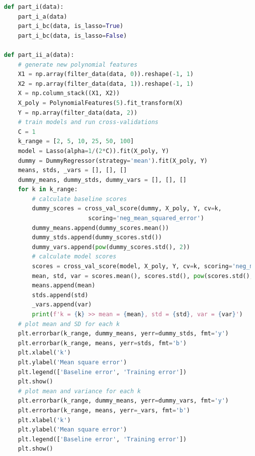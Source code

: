 \documentclass[12pt]{article}
\begin{document}
\begin{lstlisting}[language=Python]
def part_i(data):
    part_i_a(data)
    part_i_bc(data, is_lasso=True)
    part_i_bc(data, is_lasso=False)

def part_ii_a(data):
    # generate new polynomial features
    X1 = np.array(filter_data(data, 0)).reshape(-1, 1)
    X2 = np.array(filter_data(data, 1)).reshape(-1, 1)
    X = np.column_stack((X1, X2))
    X_poly = PolynomialFeatures(5).fit_transform(X)
    Y = np.array(filter_data(data, 2))
    # train models and run cross-validations
    C = 1
    k_range = [2, 5, 10, 25, 50, 100]
    model = Lasso(alpha=1/(2*C)).fit(X_poly, Y)
    dummy = DummyRegressor(strategy='mean').fit(X_poly, Y)
    means, stds, _vars = [], [], []
    dummy_means, dummy_stds, dummy_vars = [], [], []
    for k in k_range:
        # calculate baseline scores
        dummy_scores = cross_val_score(dummy, X_poly, Y, cv=k,
                        scoring='neg_mean_squared_error')
        dummy_means.append(dummy_scores.mean())
        dummy_stds.append(dummy_scores.std())
        dummy_vars.append(pow(dummy_scores.std(), 2))
        # calculate model scores
        scores = cross_val_score(model, X_poly, Y, cv=k, scoring='neg_mean_squared_error')
        mean, std, var = scores.mean(), scores.std(), pow(scores.std(), 2)
        means.append(mean)
        stds.append(std)
        _vars.append(var)
        print(f'k = {k} >> mean = {mean}, std = {std}, var = {var}')
    # plot mean and SD for each k
    plt.errorbar(k_range, dummy_means, yerr=dummy_stds, fmt='y')
    plt.errorbar(k_range, means, yerr=stds, fmt='b')
    plt.xlabel('k')
    plt.ylabel('Mean square error')
    plt.legend(['Baseline error', 'Training error'])
    plt.show()
    # plot mean and variance for each k
    plt.errorbar(k_range, dummy_means, yerr=dummy_vars, fmt='y')
    plt.errorbar(k_range, means, yerr=_vars, fmt='b')
    plt.xlabel('k')
    plt.ylabel('Mean square error')
    plt.legend(['Baseline error', 'Training error'])
    plt.show()


\end{lstlisting}
\end{document}
